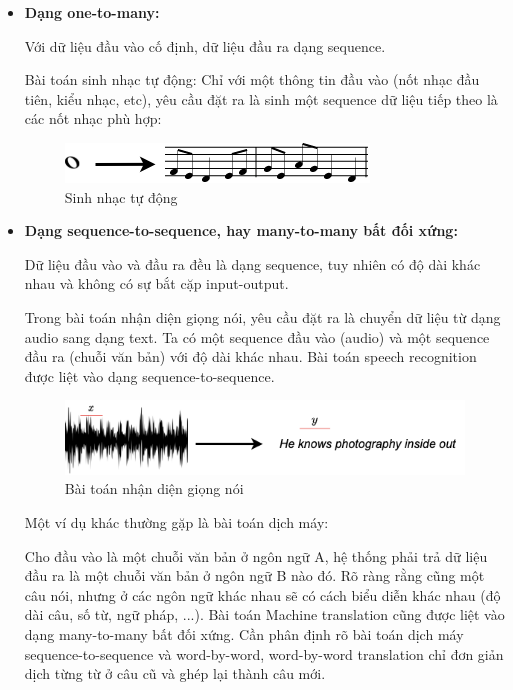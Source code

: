 \begin{itemize}
    \item \textbf{Dạng one-to-many:} 
    
    Với dữ liệu đầu vào cố định, dữ liệu đầu ra dạng sequence. 
    
    Bài toán sinh nhạc tự động: Chỉ với một thông tin đầu vào (nốt nhạc đầu tiên, kiểu nhạc, etc), yêu cầu đặt ra là sinh một sequence dữ liệu tiếp theo là các nốt nhạc phù hợp:
    
    \begin{figure}[H]
        \centering
        \includegraphics[width=\textwidth,height=\textheight,keepaspectratio]{chapter06/figure-sec1/musicgeneration.png}
        \caption{Sinh nhạc tự động}
    \end{figure}
    
    \item \textbf{Dạng sequence-to-sequence, hay many-to-many bất đối xứng:} 
    
    Dữ liệu đầu vào và đầu ra đều là dạng sequence, tuy nhiên có độ dài khác nhau và không có sự bắt cặp input-output. 
    
    Trong bài toán nhận diện giọng nói, yêu cầu đặt ra là chuyển dữ liệu từ dạng audio sang dạng text. Ta có một sequence đầu vào (audio) và một sequence đầu ra (chuỗi văn bản) với độ dài khác nhau. Bài toán speech recognition được liệt vào dạng sequence-to-sequence.
    
    \begin{figure}[H]
        \centering
        \includegraphics[width=\textwidth,height=\textheight,keepaspectratio]{chapter06/figure-sec1/soundwave.png}
        \caption{Bài toán nhận diện giọng nói}
    \end{figure}
    
    Một ví dụ khác thường gặp là bài toán dịch máy: 
    
    Cho đầu vào là một chuỗi văn bản ở ngôn ngữ A, hệ thống phải trả dữ liệu đầu ra là một chuỗi văn bản ở ngôn ngữ B nào đó. Rõ ràng rằng cũng một câu nói, nhưng ở các ngôn ngữ khác nhau sẽ có cách biểu diễn khác nhau (độ dài câu, số từ, ngữ pháp, ...). Bài toán Machine translation cũng được liệt vào dạng many-to-many bất đối xứng. Cần phân định rõ bài toán dịch máy sequence-to-sequence và word-by-word, word-by-word translation chỉ đơn giản dịch từng từ ở câu cũ và ghép lại thành câu mới.
    

\end{itemize}
